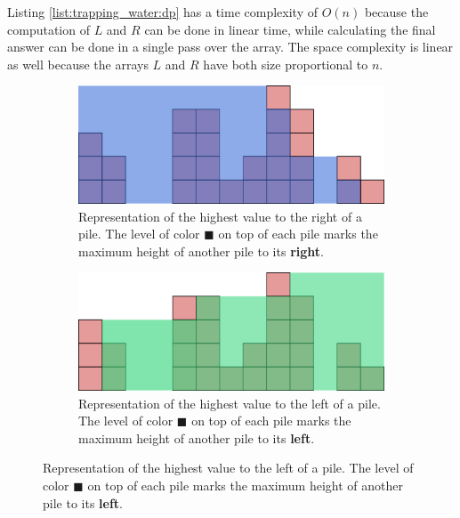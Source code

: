 Listing \ref{list:trapping_water:dp} has a time complexity of $O(n)$ because the computation of $L$ and $R$ can be done in linear time, while calculating the final answer can be done in a single pass over the array. The space complexity is linear as well because the arrays $L$ and $R$ have both size proportional to $n$.

\begin{figure}
\centering
\begin{subfigure}[b]{0.95\textwidth}
   \includegraphics[width=1\linewidth]{sources/trapping_water/images/DPR}
   \caption{Representation of the highest value to the right of a pile. The level of color \textcolor[HTML]{3268d5}{$\blacksquare$} on top of each pile marks the maximum height of another pile to its \textbf{right}.}
   \label{fig:trapping_water_DPL}
\end{subfigure}

\begin{subfigure}[b]{0.95\textwidth}
   \includegraphics[width=1\linewidth]{sources/trapping_water/images/DPL}
   \caption{Representation of the highest value to the left of a pile. The level of color \textcolor[HTML]{32d579}{$\blacksquare$} on top of each pile marks the maximum height of another pile to its \textbf{left}.}
   \label{fig:trapping_water_DPR}
\end{subfigure}


\end{figure}
